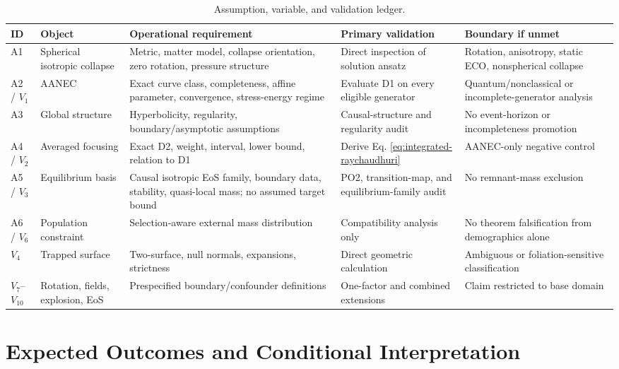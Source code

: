 \documentclass[conference]{IEEEtran}
\begin{document}
\begin{table}[t]
\caption{Assumption, variable, and validation ledger.}
\label{tab:assumption-ledger}
\centering
\scriptsize
\setlength{\tabcolsep}{3pt}
\begin{tabular}{p{}p{}p{}p{}p{}}
\toprule
\textbf{ID} & \textbf{Object} & \textbf{Operational requirement} & \textbf{Primary validation} & \textbf{Boundary if unmet}\\
\midrule
A1 & Spherical isotropic collapse & Metric, matter model, collapse orientation, zero rotation, pressure structure & Direct inspection of solution ansatz & Rotation, anisotropy, static ECO, nonspherical collapse\\
A2 / $V_1$ & AANEC & Exact curve class, completeness, affine parameter, convergence, stress-energy regime & Evaluate D1 on every eligible generator & Quantum/nonclassical or incomplete-generator analysis\\
A3 & Global structure & Hyperbolicity, regularity, boundary/asymptotic assumptions & Causal-structure and regularity audit & No event-horizon or incompleteness promotion\\
A4 / $V_2$ & Averaged focusing & Exact D2, weight, interval, lower bound, relation to D1 & Derive Eq. \eqref{eq:integrated-raychaudhuri} & AANEC-only negative control\\
A5 / $V_3$ & Equilibrium basis & Causal isotropic EoS family, boundary data, stability, quasi-local mass; no assumed target bound & PO2, transition-map, and equilibrium-family audit & No remnant-mass exclusion\\
A6 / $V_6$ & Population constraint & Selection-aware external mass distribution & Compatibility analysis only & No theorem falsification from demographics alone\\
$V_4$ & Trapped surface & Two-surface, null normals, expansions, strictness & Direct geometric calculation & Ambiguous or foliation-sensitive classification\\
$V_7$--$V_{10}$ & Rotation, fields, explosion, EoS & Prespecified boundary/confounder definitions & One-factor and combined extensions & Claim restricted to base domain\\
\bottomrule
\end{tabular}
\end{table}

\section{Expected Outcomes and Conditional Interpretation}
\label{sec:outcomes}
\end{document}
